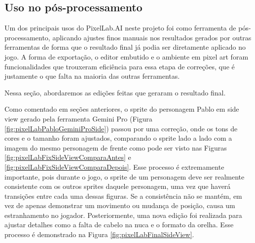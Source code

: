 \FloatBarrier
\subsection{Uso no pós-processamento}
\label{s.pixelLab.edicao}


Um dos principais usos do PixelLab.AI neste projeto foi como ferramenta de pós-processamento, aplicando ajustes finos manuais nos resultados gerados por outras ferramentas de forma que o resultado final já podia ser diretamente aplicado no jogo. A forma de exportação, o editor embutido e o ambiente em pixel art foram funcionalidades que trouxeram eficiência para essa etapa de correções, que é justamente o que falta na maioria das outras ferramentas.

Nessa seção, abordaremos as edições feitas que geraram o resultado final.

Como comentado em seções anteriores, o sprite do personagem Pablo em side view gerado pela ferramenta Gemini Pro (Figura \ref{fig:pixelLabPabloGeminiProSide}) passou por uma correção, onde os tons de cores e o tamanho foram ajustados, comparando o sprite lado a lado com a imagem do mesmo personagem de frente como pode ser visto nas Figuras \ref{fig:pixelLabFixSideViewComparaAntes} e \ref{fig:pixelLabFixSideViewComparaDepois}. Esse processo é extremamente importante, pois durante o jogo, o sprite de um personagem deve ser realmente consistente com os outros sprites daquele personagem, uma vez que haverá transições entre cada uma dessas figuras. Se a consistência não se mantém, em vez de apenas demonstrar um movimento ou mudança de posição, causa um estranhamento no jogador. Posteriormente, uma nova edição foi realizada para ajustar detalhes como a falta de cabelo na nuca e o formato da orelha. Esse processo é demonstrado na Figura \ref{fig:pixelLabFinalSideView}.


